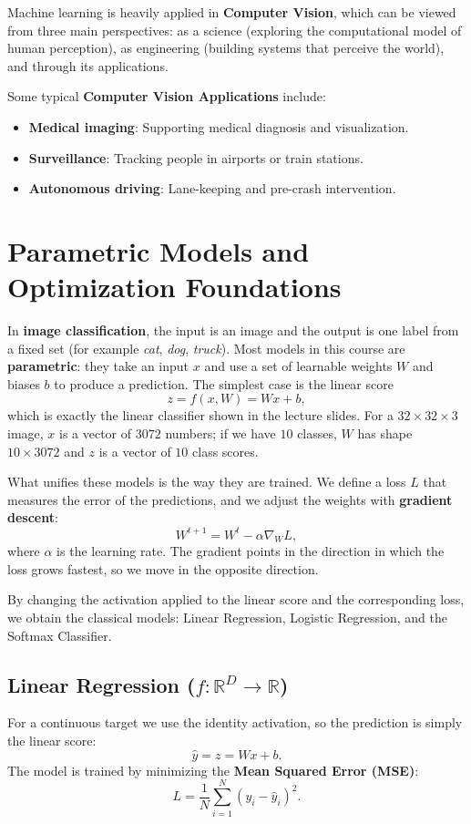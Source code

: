 Machine learning is heavily applied in \textbf{Computer Vision}, which can be viewed from three main perspectives: as a science (exploring the computational model of human perception), as engineering (building systems that perceive the world), and through its applications.

\begin{examplebox}
Some typical \textbf{Computer Vision Applications} include:
\begin{itemize}[nosep, leftmargin=*]
    \item \textbf{Medical imaging}: Supporting medical diagnosis and visualization.
    \item \textbf{Surveillance}: Tracking people in airports or train stations.
    \item \textbf{Autonomous driving}: Lane-keeping and pre-crash intervention.
\end{itemize}
\end{examplebox}

\section{Parametric Models and Optimization Foundations}

In \textbf{image classification}, the input is an image and the output is one label from a fixed set (for example \textit{cat}, \textit{dog}, \textit{truck}). Most models in this course are \textbf{parametric}: they take an input $x$ and use a set of learnable weights $W$ and biases $b$ to produce a prediction. The simplest case is the linear score
\[ z = f(x,W) = Wx + b, \]
which is exactly the linear classifier shown in the lecture slides. For a $32 \times 32 \times 3$ image, $x$ is a vector of $3072$ numbers; if we have $10$ classes, $W$ has shape $10 \times 3072$ and $z$ is a vector of $10$ class scores.

What unifies these models is the way they are trained. We define a loss $L$ that measures the error of the predictions, and we adjust the weights with \textbf{gradient descent}:
\[ W^{t+1} = W^t - \alpha \nabla_W L, \]
where $\alpha$ is the learning rate. The gradient points in the direction in which the loss grows fastest, so we move in the opposite direction.

By changing the activation applied to the linear score and the corresponding loss, we obtain the classical models: Linear Regression, Logistic Regression, and the Softmax Classifier.

\subsection{Linear Regression (\texorpdfstring{$f: \mathbb{R}^D \to \mathbb{R}$}{R -> R})}
For a continuous target we use the identity activation, so the prediction is simply the linear score:
\[ \hat{y} = z = Wx + b. \]
The model is trained by minimizing the \textbf{Mean Squared Error (MSE)}:
\[ L = \frac{1}{N} \sum_{i=1}^N {(y_i - \hat{y}_i)}^2. \]

